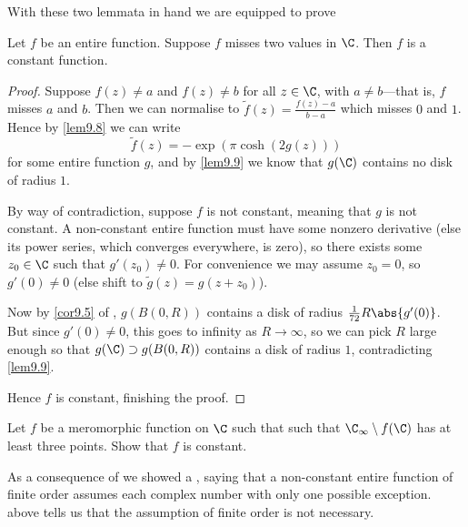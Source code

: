 


With these two lemmata in hand we are equipped to prove

\begin{theorem}\label{thm9.10}
	Let $f$ be an entire function.
	Suppose $f$ misses two values in $\C$.
	Then $f$ is a constant function.
\end{theorem}

\begin{proof}
	Suppose $f(z) \neq a$ and $f(z) \neq b$ for all $z \in \C$, with $a \neq b$---that is, $f$ misses $a$ and $b$.
	Then we can normalise to $\tilde f(z) = \frac{f(z) - a}{b - a}$ which misses $0$ and $1$.
	Hence by \autoref{lem9.8} we can write
	\[
		\tilde f(z) = -\exp(\pi  \cosh(2 g(z)))
	\]
	for some entire function $g$, and by \autoref{lem9.9} we know that $g(\C)$ contains no disk of radius $1$.

	By way of contradiction, suppose $f$ is not constant, meaning that $g$ is not constant.
	A non-constant entire function must have some nonzero derivative (else its power series, which converges everywhere, is zero), so there exists some $z_0 \in \C$ such that $g'(z_0) \neq 0$.
 	For convenience we may assume $z_0 = 0$, so $g'(0) \neq 0$ (else shift to $\tilde g(z) = g(z + z_0)$).

	Now by \autoref{cor9.5} of , $g(B(0, R))$ contains a disk of radius $\frac{1}{72} R \abs{g'(0)}$.
	But since $g'(0) \neq 0$, this goes to infinity as $R \to \infty$, so we can pick $R$ large enough so that $g(\C) \supset g(B(0, R))$ contains a disk of radius $1$, contradicting \autoref{lem9.9}.

	Hence $f$ is constant, finishing the proof.
\end{proof}

\begin{exercise}
	Let $f$ be a meromorphic function on $\C$ such that such that $\C_\infty \setminus f(\C)$ has at least three points.
	Show that $f$ is constant.
\end{exercise}


As a consequence of  we showed a , saying that a non-constant entire function of finite order assumes each complex number with only one possible exception.
 above tells us that the assumption of finite order is not necessary.


